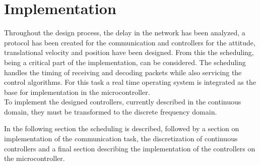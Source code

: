 \chapter{Implementation}
Throughout the design process, the delay in the network has been analyzed, a protocol has been created for the communication and controllers for the attitude, translational velocity and position have been designed. From this the scheduling, being a critical part of the implementation, can be considered. The scheduling handles the timing of receiving and decoding packets while also servicing the control algorithms. For this task a real time operating system is integrated as the base for implementation in the microcontroller.
\\
To implement the designed controllers, currently described in the continuous domain, they must be transformed to the discrete frequency domain.

In the following section the scheduling is described, followed by a section on implementation of the communication task, the discretization of continuous controllers and a final section describing the implementation of the controllers on the microcontroller.